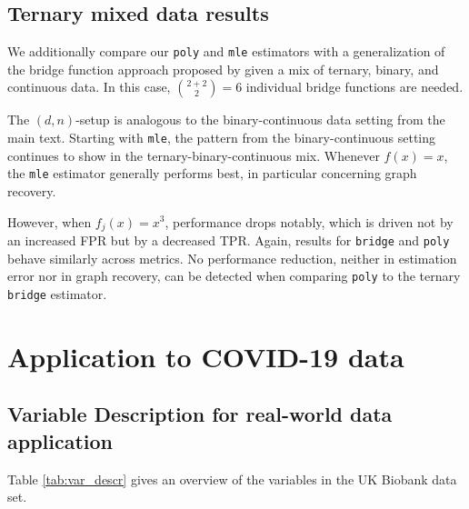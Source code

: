 \subsection{Ternary mixed data results}

We additionally compare our \texttt{poly} and \texttt{mle} estimators with a generalization of the bridge function approach proposed by \citet{Quan18} given a mix of ternary, binary, and continuous data. In this case, $ \binom{2+2}{2} = 6$ individual bridge functions are needed.

The $(d,n)$-setup is analogous to the binary-continuous data setting from the main text. Starting with \texttt{mle}, the pattern from the binary-continuous setting continues to show in the ternary-binary-continuous mix. Whenever $f(x)=x$, the \texttt{mle} estimator generally performs best, in particular concerning graph recovery.



However, when $f_j(x)=x^3$, performance drops notably, which is driven not by an increased FPR but by a decreased TPR.
Again, results for \texttt{bridge} and \texttt{poly} behave similarly across metrics. No performance reduction, neither in estimation error nor in graph recovery, can be detected when comparing \texttt{poly} to the ternary \texttt{bridge} estimator.


\section{Application to COVID-19 data}\label{sec::empirical_application}



\subsection{Variable Description for real-world data application}

Table \ref{tab:var_descr} gives an overview of the variables in the UK Biobank data set.





